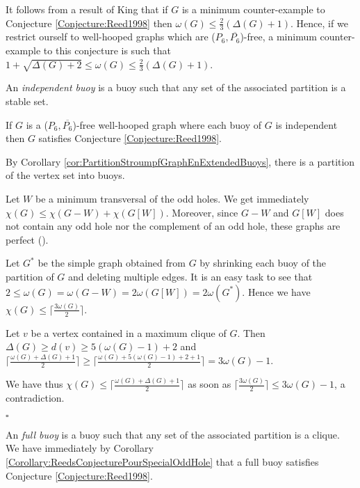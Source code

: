 \documentclass{amsart}
\theoremstyle{definition}
\theoremstyle{remark}
\newenvironment{prf}{{\bf \noindent Proof. } }{\hfill$\square$\\}
\newcommand{\wh}{well-hooped\xspace}
\newcommand{\extB}{buoy\xspace}
\newcommand{\extBs}{buoys\xspace}
\begin{document}
It follows from a result of King \cite{Kin2010} that if $G$ is a minimum counter-example to Conjecture \ref{Conjecture:Reed1998}
then $\omega(G) \leq \frac{2}{3}(\Delta(G)+1)$. Hence, if we restrict ourself to \wh graphs which are ($P_6,\overline{P_6}$)-free,
a minimum counter-example to this conjecture is such that $1+\sqrt{\Delta(G)+2} \leq \omega(G) \leq \frac{2}{3}(\Delta(G)+1)$.


An {\em independent buoy} is a buoy such that any set of the associated partition is a stable set.



\begin{thm} \label{Theorem:Independent_Buoy} If $G$ is a ($P_6,\overline{P_6}$)-free \wh graph where each buoy of $G$ is independent then $G$ satisfies Conjecture \ref{Conjecture:Reed1998}.
\end{thm}
\begin{prf}
By Corollary \ref{cor:PartitionStroumpfGraphEnExtendedBuoys}, there is a partition of the vertex set into \extBs.

Let $W$ be a minimum transversal of the odd holes.
We get immediately $\chi(G) \leq \chi(G-W) + \chi(G[W])$.
Moreover, since  $G-W$ and $G[W]$ does not contain any odd hole nor the complement of an odd hole, these graphs are perfect (\cite{ChuRobSeyTho2006}).



Let $G^{*}$ be the simple graph obtained from $G$ by shrinking each \extB of the partition of $G$ and deleting multiple edges.
It is an easy task to see that $2 \leq \omega(G)=\omega(G-W)=2\omega(G[W])=2\omega(G^{*})$. Hence we have $\chi(G) \leq \lceil \frac{3 \omega(G)}{2}\rceil$.


Let $v$ be a vertex contained in a maximum clique of $G$. Then $\Delta(G) \geq d(v) \geq 5(\omega(G)-1)+2$ and $\lceil \frac{\omega(G)+\Delta(G) +1}{2}\rceil \geq \lceil \frac{\omega(G)+5(\omega(G)-1)+2+1}{2}\rceil=3\omega(G)-1$.

We have thus
$\chi(G) \leq \lceil \frac{\omega(G)+\Delta(G) +1}{2}\rceil$ as soon as $\lceil \frac{3 \omega(G)}{2} \rceil \leq 3\omega(G)-1$, a contradiction.


\end{prf}

An {\em full \extB} is a \extB such that any set of the associated partition is a clique. We have immediately by Corollary \ref{Corollary:ReedsConjecturePourSpecialOddHole} 
that a full \extB satisfies Conjecture \ref{Conjecture:Reed1998}.
\end{document}
